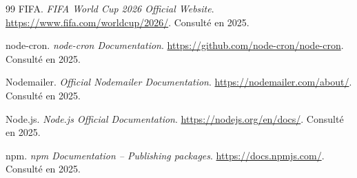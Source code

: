 \begin{thebibliography}{99}
FIFA. \textit{FIFA World Cup 2026 Official Website}. \url{https://www.fifa.com/worldcup/2026/}. Consulté en 2025.

node-cron. \textit{node-cron Documentation}. \url{https://github.com/node-cron/node-cron}. Consulté en 2025.

Nodemailer. \textit{Official Nodemailer Documentation}. \url{https://nodemailer.com/about/}. Consulté en 2025.

Node.js. \textit{Node.js Official Documentation}. \url{https://nodejs.org/en/docs/}. Consulté en 2025.

npm. \textit{npm Documentation -- Publishing packages}. \url{https://docs.npmjs.com/}. Consulté en 2025.

\end{thebibliography}
\endgroup
